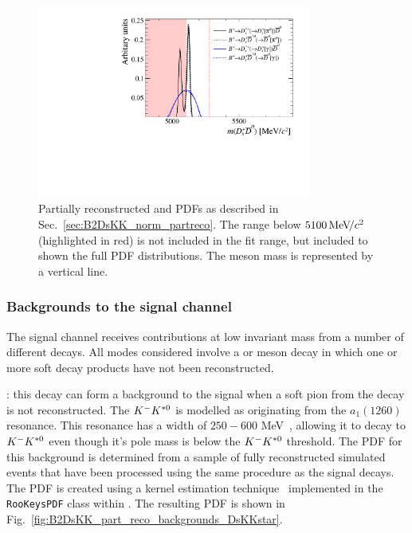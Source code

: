 \begin{figure}[!h]
    \centering
    \includegraphics[width=0.80\textwidth]{figs/B2DsKK/B2DsKK_DsD0_part_reco_Shapes.pdf}
    \caption{Partially reconstructed \decay{\Bp}{\Dssp\Dzb} and \decay{\Bp}{\Dsp\Dstarzb} PDFs as described in Sec.~\ref{sec:B2DsKK_norm_partreco}. The range below $5100{\mathrm{\,Me\kern -0.1em V\!/}c^2}$ (highlighted in red) is not included in the fit range, but included to shown the full PDF distributions. The \Bp meson mass is represented by a vertical line.} 
    \label{fig:B2DsPhi_DsD0_partreco}   
\end{figure}





\subsubsection{Backgrounds to the signal channel}

The signal channel receives contributions at low invariant mass from a number of different decays. 
All modes considered involve a \Bs or \Bz meson decay in which one or more soft decay products have not been reconstructed.

\begin{description}
\item \decay{\Bsb}{\Dsp\Km\Kstarz}: this decay can form a background to the \decay{\Bp}{\Dsp\Kp\Km} signal when a soft pion from the \decay{\Kstarz}{\Kp\pim} decay is not reconstructed. The ${{K}^-}{{K}^{*0}}$ is modelled as originating from the $a_1(1260)$ resonance. This resonance has a width of $250-600$ MeV~\cite{PDG2016}, allowing it to decay to ${{K}^-}{{K}^{*0}}$ even though it's pole mass is below the ${{K}^-}{{K}^{*0}}$ threshold.
The PDF for this background is determined from a sample of fully reconstructed simulated events that have been processed using the same procedure as the signal decays. The PDF is created using a kernel estimation technique~\cite{Cranmer:2000du} implemented in the \texttt{RooKeysPDF} class within \roofit. The resulting PDF is shown in Fig.~\ref{fig:B2DsKK_part_reco_backgrounds_DsKKstar}.
\end{description}

